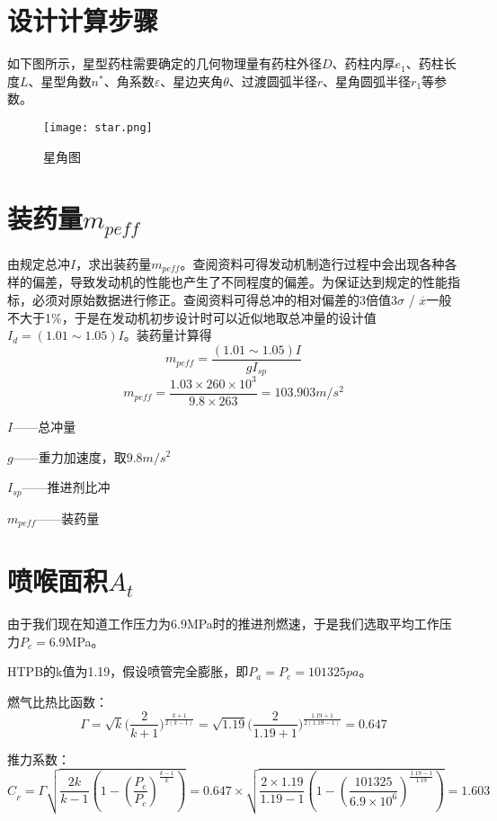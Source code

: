 \section{设计计算步骤}

如下图所示，星型药柱需要确定的几何物理量有药柱外径$D$、药柱内厚$e_{1}$、药柱长度$L$、星型角数$n^{*}$、角系数$\varepsilon $、星边夹角$\theta $、过渡圆弧半径$r$、星角圆弧半径$r_{1}$等参数。

\begin{figure}
  \centering
  \texttt{[image: star.png]}
  \caption{星角图}
  \label{fig:star}
\end{figure}

\section{装药量$m_{peff}$}

由规定总冲$I$，求出装药量$m_{peff}$。查阅资料可得发动机制造行过程中会出现各种各样的偏差，导致发动机的性能也产生了不同程度的偏差。为保证达到规定的性能指标，必须对原始数据进行修正。查阅资料可得总冲的相对偏差的3倍值$3\sigma $ / $\overline{x}$一般不大于1\%，于是在发动机初步设计时可以近似地取总冲量的设计值$I_{d}=(1.01\sim 1.05)I$。装药量计算得
\[
  m_{peff}=\frac{(1.01\sim 1.05)I}{gI_{sp}}
  \]
  \[
m_{peff}=\frac{1.03\times 260\times 10^3}{9.8\times 263}=103.903 m/s^2
\]

$I$——总冲量

$g$——重力加速度，取$9.8m/s^{2}$

$I_{sp}$——推进剂比冲

$m_{peff}$——装药量

\section{喷喉面积$A_{t}$}

由于我们现在知道工作压力为6.9MPa时的推进剂燃速，于是我们选取平均工作压力$P_{c}=6.9$MPa。

HTPB的k值为1.19，假设喷管完全膨胀，即$P_{a}=P_{e}=101325pa$。

燃气比热比函数：
\[\Gamma =\sqrt{k}\bigl( \frac{2}{k+1} \bigr) ^{\frac{k+1}{2\left( k-1 \right)}}=\sqrt{1.19}\bigl( \frac{2}{1.19+1} \bigr) ^{\frac{1.19+1}{2\left( 1.19-1 \right)}}=0.647
\]

推力系数：
\[
C_{_F}=\Gamma \sqrt{\frac{2k}{k-1}(1-(\frac{P_e}{P_c})^{\frac{k-1}{k}})}=0.647\times \sqrt{\frac{2\times 1.19}{1.19-1}(1-(\frac{101325}{6.9\times 10^6})^{\frac{1.19-1}{1.19}})}=1.603
\]

